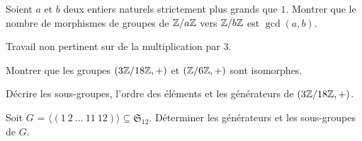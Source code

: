 \documentclass{report}
\begin{document}
\begin{exo}
    Soient \(a\) et \(b\) deux entiers naturels strictement plus grands que \(1\).
    Montrer que le nombre de morphismes de groupes de \(\mathbb{Z}/a\mathbb{Z}\) vers \(\mathbb{Z}/b\mathbb{Z}\)
    est \(\gcd(a,b)\).
\end{exo}

\begin{exo}
    Travail non pertinent sur de la multiplication par 3.
    \begin{q}{1}
        Montrer que les groupes \(\left(3\mathbb{Z}/18\mathbb{Z},+\right)\) et \(\left(\mathbb{Z}/6\mathbb{Z},+\right)\)
        sont isomorphes.
    \end{q}
    \begin{q}{2}
        Décrire les sous-groupes, l'ordre des éléments et les générateurs de
        \(\left(3\mathbb{Z}/18\mathbb{Z},+\right)\).
    \end{q}
\end{exo}


\begin{exo}
    Soit \(G\) = \(\langle(1\ 2\ \dots\ 11\ 12)\rangle\subseteq\mathfrak{S}_{12}\).
    Déterminer les générateurs et les sous-groupes de \(G\).
\end{exo}
\end{document}
